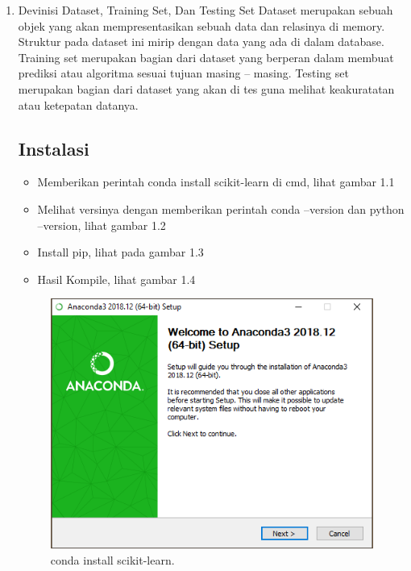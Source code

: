 \begin{enumerate}
\item
Devinisi Dataset, Training Set, Dan Testing Set
\subitem
Dataset merupakan sebuah objek yang akan mempresentasikan sebuah data dan relasinya di memory. Struktur pada dataset ini mirip dengan data yang ada di dalam database. Training set merupakan bagian dari dataset yang berperan dalam membuat prediksi atau algoritma sesuai tujuan masing – masing. Testing set merupakan bagian dari dataset yang akan di tes guna melihat keakuratatan atau ketepatan datanya.

\subsection{Instalasi}

\begin{itemize}
\item
Memberikan perintah conda install scikit-learn di cmd, lihat gambar 1.1
\item
Melihat versinya dengan memberikan perintah conda --version dan python --version, lihat gambar 1.2
\item
Install pip, lihat pada gambar 1.3
\item
Hasil Kompile, lihat gambar 1.4
\end{itemize}


\begin{figure}[ht]\centerline{\includegraphics[width=1\textwidth]{figures/2.PNG}}\caption{conda install scikit-learn.}\end{figure}


\end{enumerate}
